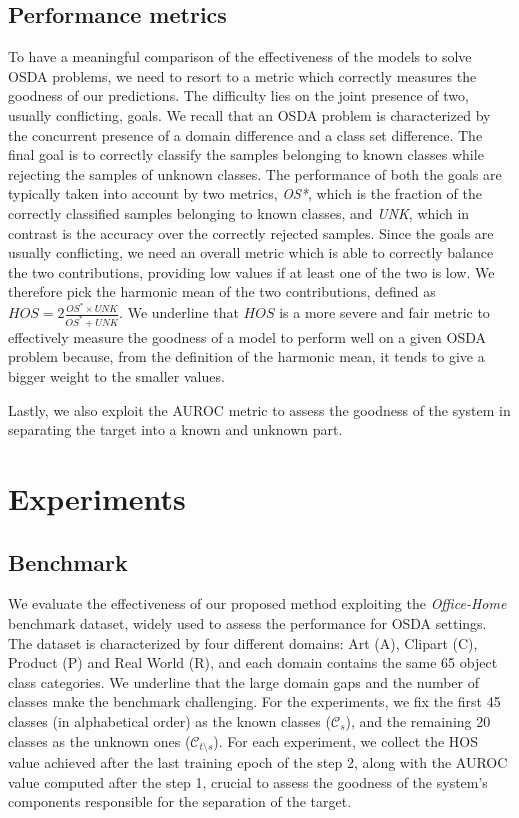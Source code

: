\documentclass[10pt,twocolumn,letterpaper]{article}
\begin{document}
\subsection{Performance metrics}
\label{sec:performance_metrics}

To have a meaningful comparison of the effectiveness
of the models to solve OSDA problems, we need to resort to a metric which
correctly measures the goodness of our predictions.
The difficulty lies on the joint presence of two, usually conflicting, goals.
We recall that an OSDA problem is characterized by the concurrent presence of
a domain difference and a class set difference.
The final goal is to correctly classify the samples belonging to known classes
while rejecting the samples of unknown classes.
The performance of both the goals are typically taken into account by two metrics, {\it OS*},
which is the fraction of the correctly classified samples belonging to known classes, and {\it UNK},
which in contrast is the accuracy over the correctly rejected samples.
Since the goals are usually conflicting, we need an overall metric which is able to correctly balance
the two contributions, providing low values if at least one of the two is low.
We therefore pick the harmonic mean of the two contributions, defined as $HOS = 2\frac{OS^*\times UNK}{OS^*+UNK}$.
We underline that $HOS$ is a more severe and fair metric to effectively measure the goodness of a model to perform well
on a given OSDA problem because, from the definition of the harmonic mean, it tends to give a bigger weight to the smaller values.

Lastly, we also exploit the AUROC metric to assess the goodness of the system in separating
the target into a known and unknown part.

\section{Experiments}
\label{sec:experiments}

\subsection{Benchmark}
\label{sec:dataset}

We evaluate the effectiveness of our proposed method exploiting the {\it Office-Home} \cite{OfficeHomeDataset} benchmark dataset,
widely used to assess the performance for OSDA settings.
The dataset is characterized by four different domains: Art (A), Clipart (C), Product (P) and Real World (R), and
each domain contains the same 65 object class categories.
We underline that the large domain gaps and the number of classes make the benchmark challenging.
For the experiments, we fix the first 45 classes (in alphabetical order) as the known classes ($\mathcal{C}_s$),
and the remaining 20 classes as the unknown ones ($\mathcal{C}_{t \setminus s}$).
For each experiment, we collect the HOS value achieved after the last training epoch of the step 2,
along with the AUROC value computed after the step 1, crucial to assess the goodness
of the system's components responsible for the separation of the target.
\end{document}
